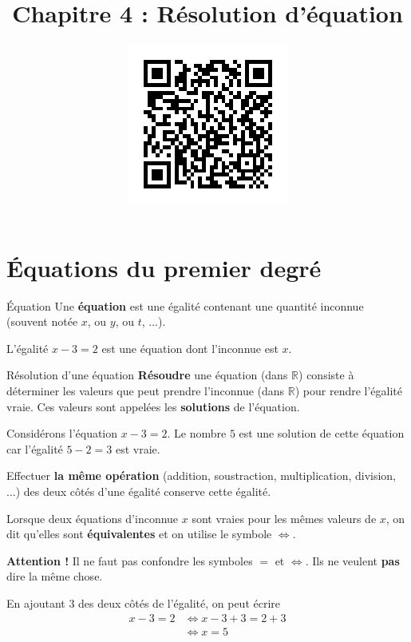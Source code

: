 \documentclass[11pt]{article}
\title{\vspace{-15mm}Chapitre 4 : Résolution d'équation}
\date{\vspace{-14mm}
\href{https://erou.forge.aeif.fr/s11/equation.html}{
  \includegraphics[scale=.6]{qr-equation.png}}
\vspace{-12mm}}
\author{}
\begin{document}
\maketitle\thispagestyle{fancy}

\section{Équations du premier degré}
\begin{defi}{Équation}
  Une \textbf{équation} est une égalité contenant une quantité inconnue (souvent
  notée $x$, ou $y$, ou $t$, ...).
\end{defi}
\begin{exemple}
  L'égalité $x-3=2$ est une équation dont l'inconnue est $x$.
\end{exemple}
\begin{defi}{Résolution d'une équation}
  \textbf{Résoudre} une équation (dans $\mathbb{R}$) consiste à déterminer les valeurs que peut prendre
  l'inconnue (dans $\mathbb{R}$) pour rendre l'égalité vraie. Ces valeurs sont appelées les
  \textbf{solutions} de l'équation.
\end{defi}
\begin{exemple}
 Considérons l'équation $x-3=2$. Le nombre $5$ est une solution de cette
 équation car l'égalité $5-2=3$ est vraie. 
\end{exemple}
\begin{prop}
  Effectuer \textbf{la même opération} (addition, soustraction,
  multiplication, division, ...) des deux côtés d'une égalité conserve cette
  égalité.
\end{prop}
\begin{notation}
  Lorsque deux équations d'inconnue $x$ sont vraies pour les mêmes valeurs de
  $x$, on dit qu'elles sont \textbf{équivalentes} et on utilise le symbole
  $\Longleftrightarrow$.
\end{notation}
\begin{rmq}
  \textbf{Attention !} Il ne faut pas confondre les symboles $=$ et
  $\Leftrightarrow$. Ils ne veulent \textbf{pas} dire la même chose.
\end{rmq}
\begin{exemple}
  En ajoutant $3$ des deux côtés de l'égalité, on peut écrire
  \begin{align*}
    x-3=2 &\Longleftrightarrow x-3+3=2+3 \\
    &\Longleftrightarrow x=5
  \end{align*}
\end{exemple}
\end{document}
